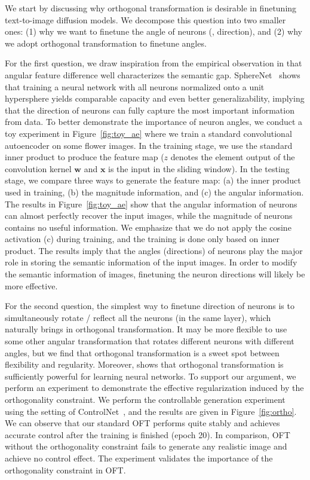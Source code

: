 We start by discussing why orthogonal transformation is desirable in finetuning text-to-image diffusion models. We decompose this question into two smaller ones: (1) why we want to finetune the angle of neurons (\ie, direction), and (2) why we adopt orthogonal transformation to finetune angles.



For the first question, we draw inspiration from the empirical observation in \cite{liu2018decoupled,chen2020angular} that angular feature difference well characterizes the semantic gap. SphereNet~\cite{liu2017deep} shows that training a neural network with all neurons normalized onto a unit hypersphere yields comparable capacity and even better generalizability, implying that the direction of neurons can fully capture the most important information from data. To better demonstrate the importance of neuron angles, we conduct a toy experiment in Figure~\ref{fig:toy_ae} where we train a standard convolutional autoencoder on some flower images. In the training stage, we use the standard inner product to produce the feature map ($z$ denotes the element output of the convolution kernel $\bm{w}$ and $\bm{x}$ is the input in the sliding window). In the testing stage, we compare three ways to generate the feature map: (a) the inner product used in training, (b) the magnitude information, and (c) the angular information. The results in Figure~\ref{fig:toy_ae} show that the angular information of neurons can almost perfectly recover the input images, while the magnitude of neurons contains no useful information. We emphasize that we do not apply the cosine activation (c) during training, and the training is done only based on inner product. The results imply that the angles (directions) of neurons play the major role in storing the semantic information of the input images. In order to modify the semantic information of images, finetuning the neuron directions will likely be more effective.



For the second question, the simplest way to finetune direction of neurons is to simultaneously rotate / reflect all the neurons (in the same layer), which naturally brings in orthogonal transformation. It may be more flexible to use some other angular transformation that rotates different neurons with different angles, but we find that orthogonal transformation is a sweet spot between flexibility and regularity. Moreover, \cite{liu2021orthogonal} shows that orthogonal transformation is sufficiently powerful for learning neural networks. To support our argument, we perform an experiment to demonstrate the effective regularization induced by the orthogonality constraint. We perform the controllable generation experiment using the setting of ControlNet~\cite{zhang2023adding}, and the results are given in Figure~\ref{fig:ortho}. We can observe that our standard OFT performs quite stably and achieves accurate control after the training is finished (epoch 20). In comparison, OFT without the orthogonality constraint fails to generate any realistic image and achieve no control effect. The experiment validates the importance of the orthogonality constraint in OFT.


